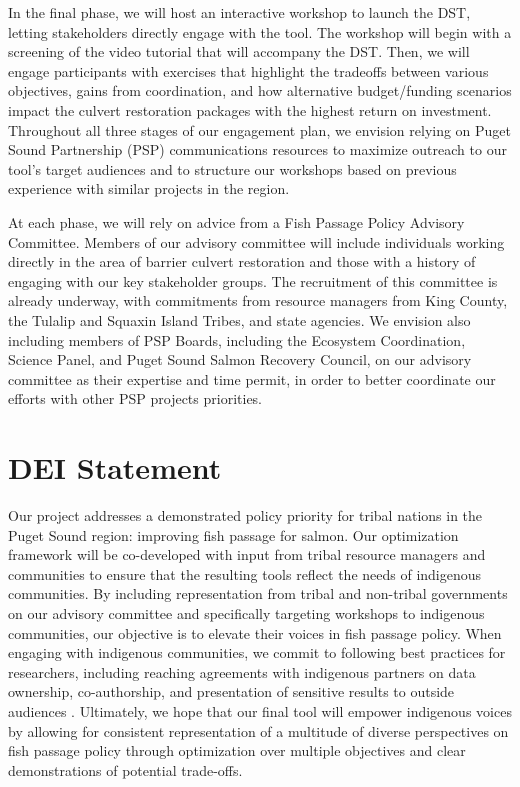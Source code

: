 \documentclass[12pt]{elsarticle}
\begin{document}
	In the final phase, we will host an interactive workshop to launch the DST, letting stakeholders directly engage with the tool. The workshop will begin with a screening of the video tutorial that will accompany the DST. Then, we will engage participants with exercises that highlight the tradeoffs between various objectives, gains from coordination, and how alternative budget/funding scenarios impact the culvert restoration packages with the highest return on investment. Throughout all three stages of our engagement plan, we envision relying on Puget Sound Partnership (PSP) communications resources to maximize outreach to our tool's target audiences and to structure our workshops based on previous experience with similar projects in the region. 
	
	At each phase, we will rely on advice from a Fish Passage Policy Advisory Committee. Members of our advisory committee will include individuals working directly in the area of barrier culvert restoration and those with a history of engaging with our key stakeholder groups. The recruitment of this committee is already underway, with commitments from resource managers from King County, the Tulalip and Squaxin Island Tribes, and state agencies. We envision also including members of PSP Boards, including the Ecosystem Coordination, Science Panel, and Puget Sound Salmon Recovery Council, on our advisory committee as their expertise and time permit, in order to better coordinate our efforts with other PSP projects priorities. 
	
	\section{DEI Statement}
	Our project addresses a demonstrated policy priority for tribal nations in the Puget Sound region: improving fish passage for salmon. Our optimization framework will be co-developed with input from tribal resource managers and communities to ensure that the resulting tools reflect the needs of indigenous communities. By including representation from tribal and non-tribal governments on our advisory committee and specifically targeting workshops to indigenous communities, our objective is to elevate their voices in fish passage policy. When engaging with indigenous communities, we commit to following best practices for researchers, including reaching agreements with indigenous partners on data ownership, co-authorship, and presentation of sensitive results to outside audiences \cite{ban_incorporate_2018}. Ultimately, we hope that our final tool will empower indigenous voices by allowing for consistent representation of a multitude of diverse perspectives on fish passage policy through optimization over multiple objectives and clear demonstrations of potential trade-offs.
	
\end{document}
